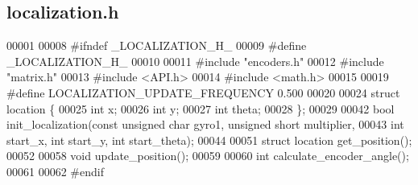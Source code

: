 \subsection{localization.\+h}
\label{a00032_source}

\begin{DoxyCode}
00001 
00008 \textcolor{preprocessor}{#ifndef \_LOCALIZATION\_H\_}
00009 \textcolor{preprocessor}{#define \_LOCALIZATION\_H\_}
00010 
00011 \textcolor{preprocessor}{#include "encoders.h"}
00012 \textcolor{preprocessor}{#include "matrix.h"}
00013 \textcolor{preprocessor}{#include <API.h>}
00014 \textcolor{preprocessor}{#include <math.h>}
00015 
00019 \textcolor{preprocessor}{#define LOCALIZATION\_UPDATE\_FREQUENCY 0.500}
00020 
00024 \textcolor{keyword}{struct }location \{
00025   \textcolor{keywordtype}{int} x;
00026   \textcolor{keywordtype}{int} y;
00027   \textcolor{keywordtype}{int} theta;
00028 \};
00029 
00042 \textcolor{keywordtype}{bool} init_localization(\textcolor{keyword}{const} \textcolor{keywordtype}{unsigned} \textcolor{keywordtype}{char} gyro1, \textcolor{keywordtype}{unsigned} \textcolor{keywordtype}{short} multiplier,
00043                        \textcolor{keywordtype}{int} start\_x, \textcolor{keywordtype}{int} start\_y, \textcolor{keywordtype}{int} start\_theta);
00044 
00051 \textcolor{keyword}{struct }location get_position();
00052 
00058 \textcolor{keywordtype}{void} update_position();
00059 
00060 \textcolor{keywordtype}{int} calculate_encoder_angle();
00061 
00062 \textcolor{preprocessor}{#endif}
\end{DoxyCode}
